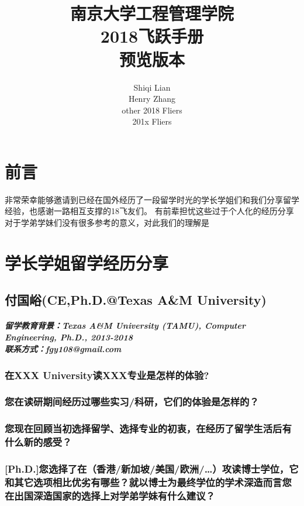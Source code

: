 \documentclass[a4paper,UTF8]{book}
\begin{document}
\title{南京大学工程管理学院\\2018飞跃手册\\预览版本}
\author{Shiqi Lian\\Henry Zhang\\other 2018 Fliers\\201x Fliers }
\maketitle %
\tableofcontents
\chapter{前言}
非常荣幸能够邀请到已经在国外经历了一段留学时光的学长学姐们和我们分享留学经验，也感谢一路相互支撑的18飞友们。
有前辈担忧这些过于个人化的经历分享对于学弟学妹们没有很多参考的意义，对此我们的理解是
\chapter{学长学姐留学经历分享}  %

\newpage
\section{付国峪(CE,Ph.D.@Texas A\&M University)}
\paragraph{留学教育背景：Texas A\&M University (TAMU), Computer Engineering, Ph.D., 2013-2018\\联系方式：fgy108@gmail.com}

\subsection*{在XXX University读XXX专业是怎样的体验?}

\subsection*{您在读研期间经历过哪些实习/科研，它们的体验是怎样的？}

\subsection*{您现在回顾当初选择留学、选择专业的初衷，在经历了留学生活后有什么新的感受？}

\subsection*{[Ph.D.]您选择了在（香港/新加坡/美国/欧洲/…）攻读博士学位，它和其它选项相比优劣有哪些？就以博士为最终学位的学术深造而言您在出国深造国家的选择上对学弟学妹有什么建议？}
\end{document}
